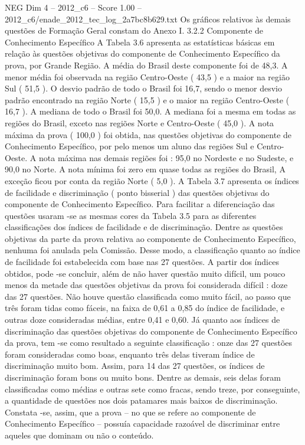 \begin{textsample}{NEG Dim 4 – 2012\_c6 – Score 1.00 – 2012\_c6/enade\_2012\_tec\_log\_2a7bc8b629.txt}
Os gráficos relativos às demais questões de Formação Geral constam do Anexo I. 3.2.2 Componente de Conhecimento Específico A Tabela 3.6 apresenta as estatísticas básicas em relação às questões objetivas do componente de Conhecimento Específico da prova, por Grande Região.
A média do Brasil deste componente foi de 48,3.
A menor média foi observada na região Centro-Oeste ( 43,5 ) e a maior na região Sul ( 51,5 ).
O desvio padrão de todo o Brasil foi 16,7, sendo o menor desvio padrão encontrado na região Norte ( 15,5 ) e o maior na região Centro-Oeste ( 16,7 ).
A mediana de todo o Brasil foi 50,0.
A mediana foi a mesma em todas as regiões do Brasil, exceto nas regiões Norte e Centro-Oeste ( 45,0 ).
A nota máxima da prova ( 100,0 ) foi obtida, nas questões objetivas do componente de Conhecimento Específico, por pelo menos um aluno das regiões Sul e Centro-Oeste.
A nota máxima nas demais regiões foi : 95,0 no Nordeste e no Sudeste, e 90,0 no Norte.
A nota mínima foi zero em quase todas as regiões do Brasil, A exceção ficou por conta da região Norte ( 5,0 ).
A Tabela 3.7 apresenta os índices de facilidade e discriminação ( ponto bisserial ) das questões objetivas do componente de Conhecimento Específico.
Para facilitar a diferenciação das questões usaram -se as mesmas cores da Tabela 3.5 para as diferentes classificações dos índices de facilidade e de discriminação.
Dentre as questões objetivas da parte da prova relativa ao componente de Conhecimento Específico, nenhuma foi anulada pela Comissão.
Desse modo, a classificação quanto ao índice de facilidade foi estabelecida com base nas 27 questões.
A partir dos índices obtidos, pode -se concluir, além de não haver questão muito difícil, um pouco menos da metade das questões objetivas da prova foi considerada difícil : doze das 27 questões.
Não houve questão classificada como muito fácil, ao passo que três foram tidas como fáceis, na faixa de 0,61 a 0,85 do índice de facilidade, e outras doze consideradas médias, entre 0,41 e 0,60.
Já quanto aos índices de discriminação das questões objetivas do componente de Conhecimento Específico da prova, tem -se como resultado a seguinte classificação : onze das 27 questões foram consideradas como boas, enquanto três delas tiveram índice de discriminação muito bom.
Assim, para 14 das 27 questões, os índices de discriminação foram bons ou muito bons.
Dentre as demais, seis delas foram classificadas como médias e outras sete como fracas, sendo treze, por conseguinte, a quantidade de questões nos dois patamares mais baixos de discriminação.
Constata -se, assim, que a prova – no que se refere ao componente de Conhecimento Específico – possuía capacidade razoável de discriminar entre aqueles que dominam ou não o conteúdo.

\end{textsample}
